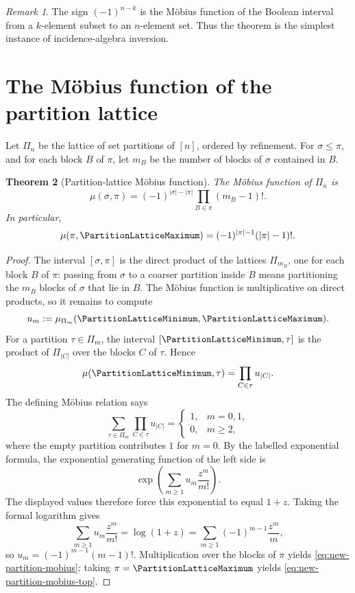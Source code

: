 \documentclass[11pt,a4paper,oneside,openany]{book}
\newtheorem{theorem}{Theorem}[chapter]
\theoremstyle{definition}
\theoremstyle{remark}
\newtheorem{remark}[theorem]{Remark}
\begin{document}
\begin{remark}
The sign $(-1)^{n-k}$ is the Möbius function of the Boolean interval from a
$k$-element subset to an $n$-element set.  Thus the theorem is the simplest
instance of incidence-algebra inversion.
\end{remark}

\section{The Möbius function of the partition lattice}

Let $\Pi_n$ be the lattice of set partitions of $[n]$, ordered by refinement.
For $\sigma\le\pi$, and for each block $B$ of $\pi$, let $m_B$ be the number
of blocks of $\sigma$ contained in $B$.

\begin{theorem}[Partition-lattice Möbius function]\label{thm:new-partition-mobius}
The Möbius function of $\Pi_n$ is
\begin{equation}\label{eq:new-partition-mobius}
 \mu(\sigma,\pi)=
 (-1)^{|\sigma|-|\pi|}\prod_{B\in\pi}(m_B-1)!.
\end{equation}
In particular,
\begin{equation}\label{eq:new-partition-mobius-top}
 \mu(\pi,\PartitionLatticeMaximum)=(-1)^{|\pi|-1}(|\pi|-1)!.
\end{equation}
\end{theorem}

\begin{proof}
The interval $[\sigma,\pi]$ is the direct product of the lattices
$\Pi_{m_B}$, one for each block $B$ of $\pi$: passing from $\sigma$ to a
coarser partition inside $B$ means partitioning the $m_B$ blocks of $\sigma$
that lie in $B$.  The Möbius function is multiplicative on direct products, so
it remains to compute
\[
 u_m:=\mu_{\Pi_m}(\PartitionLatticeMinimum,\PartitionLatticeMaximum).
\]
For a partition $\tau\in\Pi_m$, the interval $[\PartitionLatticeMinimum,\tau]$ is the
product of $\Pi_{|C|}$ over the blocks $C$ of $\tau$.  Hence
\[
 \mu(\PartitionLatticeMinimum,\tau)=\prod_{C\in\tau}u_{|C|}.
\]
The defining Möbius relation says
\[
 \sum_{\tau\in\Pi_m}\prod_{C\in\tau}u_{|C|}
 =\begin{cases}1,&m=0,1,\\0,&m\ge2,
 \end{cases}
\]
where the empty partition contributes $1$ for $m=0$.  By the labelled
exponential formula, the exponential generating function of the left side is
\[
 \exp\left(\sum_{m\ge1}u_m\frac{z^m}{m!}\right).
\]
The displayed values therefore force this exponential to equal $1+z$.
Taking the formal logarithm gives
\[
 \sum_{m\ge1}u_m\frac{z^m}{m!}=\log(1+z)
 =\sum_{m\ge1}(-1)^{m-1}\frac{z^m}{m},
\]
so $u_m=(-1)^{m-1}(m-1)!$.  Multiplication over the blocks of $\pi$ yields
\eqref{eq:new-partition-mobius}; taking $\pi=\PartitionLatticeMaximum$ yields
\eqref{eq:new-partition-mobius-top}.
\end{proof}
\end{document}
